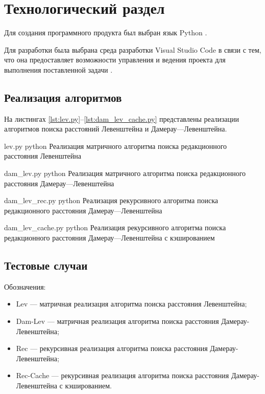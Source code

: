 \chapter{Технологический раздел}

Для создания программного продукта был выбран язык Python \cite{python}.

Для разработки была выбрана среда разработки Visual Studio Code в связи с тем, что она предоставляет возможности управления и ведения проекта для выполнения поставленной задачи \cite{vscode}.

\section{Реализация алгоритмов}

На листингах \ref{lst:lev.py}--\ref{lst:dam_lev_cache.py} представлены реализации алгоритмов поиска расстояний Левенштейна и Дамерау---Левенштейна.

\newpage

	{lev.py}
	{python}
	{Реализация матричного алгоритма поиска редакционного расстояния Левенштейна}

\newpage

	{dam_lev.py}
	{python}
	{Реализация матричного алгоритма поиска редакционного расстояния Дамерау---Левенштейна}

\newpage

	{dam_lev_rec.py}
	{python}
	{Реализация рекурсивного алгоритма поиска редакционного расстояния Дамерау---Левенштейна}

\newpage

	{dam_lev_cache.py}
	{python}
	{Реализация рекурсивного алгоритма поиска редакционного расстояния Дамерау---Левенштейна с кэшированием}

\section{Тестовые случаи}

Обозначения:
\begin{itemize}
	\item Lev --- матричная реализация алгоритма поиска расстояния Левенштейна;
	\item Dam-Lev --- матричная реализация алгоритма поиска расстояния Дамерау-Левенштейна;
	\item Rec --- рекурсивная реализация алгоритма поиска расстояния Дамерау-Левенштейна;
	\item Rec-Cache --- рекурсивная реализация алгоритма поиска расстояния Дамерау-Левенштейна с кэшированием.
\end{itemize}


